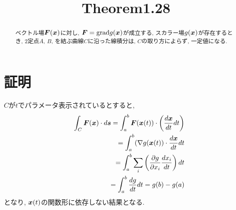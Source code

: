 \documentclass{jsarticle} \usepackage[dvipdfmx]{graphicx} \usepackage[dvipdfmx]{hyperref}
\title{Theorem1.28}
\newcommand*{\mbold}[1]{\mbox{\boldmath $#1$}}
\newcommand*{\grad}{{\rm grad}}
\begin{document}
\maketitle

\begin{abstract}
  ベクトル場$\mbold{F}(\mbold{x})$に対し, $\mbold{F} = \grad{g(\mbold{x})}$が成立する, スカラー場$g(\mbold{x})$が存在するとき, 
  2定点$A$, $B$, を結ぶ曲線$C$に沿った線積分は, $C$の取り方によらず, 一定値になる.  
\end{abstract}

\section*{証明}
$C$が$t$でパラメータ表示されているとすると, 
\begin{eqnarray}
  && \int_C \mbold{F}(\mbold{x}) \cdot d\mbold{s} = \int_a^b \mbold{F}(\mbold{x}(t)) \cdot \left(\frac{d\mbold{x}}{dt}dt \right) \nonumber\\
  && = \int_a^b (\nabla g(\mbold{x}(t)) \cdot \frac{d \mbold{x}}{dt}dt \nonumber\\
  && = \int_a^b \sum_i \left( \frac{\partial g}{\partial x_i}\frac{d x_i}{dt} \right)dt \nonumber\\
  && = \int_a^b \frac{d g}{dt} dt = g(b) - g(a)
\end{eqnarray}
となり, $\mbold{x}(t)$の関数形に依存しない結果となる. 
\end{document}
